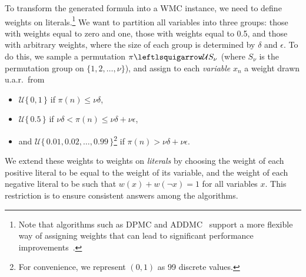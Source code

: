 \documentclass[runningheads]{llncs}
\begin{document}
To transform the generated formula into a \textsf{WMC} instance, we need to
define weights on literals.\footnote{Note that algorithms such as \textsc{DPMC}
  and \textsc{ADDMC}~\cite{DBLP:conf/aaai/DudekPV20,DBLP:conf/cp/DudekPV20}
  support a more flexible way of assigning weights that can lead to significant
  performance
  improvements~\cite{DBLP:conf/uai/DilkasB21,DBLP:conf/sat/DilkasB21}.} We want
to partition all variables into three groups: those with weights equal to zero
and one, those with weights equal to 0.5, and those with arbitrary weights,
where the size of each group is determined by $\delta$ and $\epsilon$. To do
this, we sample a permutation $\pi \leftlsquigarrow \mathcal{U}S_\nu$ (where
$S_\nu$ is the permutation group on $\{1, 2, \dots, \nu \}$), and assign to each
\emph{variable} $x_n$ a weight drawn u.a.r.\ from
\begin{itemize}
\item $\mathcal{U}\{\,0, 1\,\}$ if $\pi(n) \le \nu\delta$,
\item $\mathcal{U}\{\,0.5\,\}$ if $\nu\delta < \pi(n) \le \nu\delta +
  \nu\epsilon$,
\item and $\mathcal{U}\{\, 0.01, 0.02, \dots, 0.99 \,\}$\footnote{For
    convenience, we represent $(0, 1)$ as 99 discrete values.} if $\pi(n) >
  \nu\delta + \nu\epsilon$.
\end{itemize}
We extend these weights to weights on \emph{literals} by choosing the weight of
each positive literal to be equal to the weight of its variable, and the weight
of each negative literal to be such that $w(x) + w(\neg x) = 1$ for all
variables $x$. This restriction is to ensure consistent answers among the
algorithms.
\end{document}
